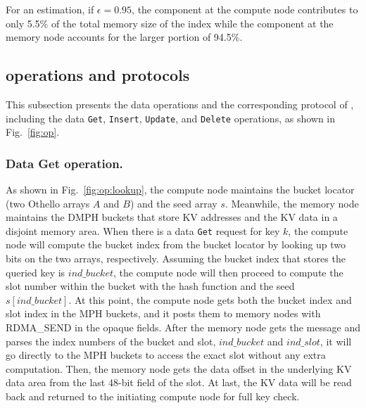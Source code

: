 For an estimation, if $\epsilon=0.95$, the component at the compute node contributes to only 5.5\% of the total memory size of the index while the component at the memory node accounts for the larger portion of 94.5\%.

\vspace{-1.5ex}
\subsection{\sys operations and protocols}
\label{subsec:design:operation}

This subsection presents the data operations and the corresponding protocol of \sys, including the data \texttt{Get}, \texttt{Insert}, \texttt{Update}, and \texttt{Delete} operations, as shown in Fig.~\ref{fig:op}.
\vspace{-1.ex}
\subsubsection{Data Get operation.}
As shown in Fig.~\ref{fig:op:lookup}, the compute node maintains the bucket locator (two Othello arrays $A$ and $B$) and the seed array $s$. Meanwhile, the memory node maintains the DMPH buckets that store KV addresses and the KV data in a disjoint memory area. 
When there is a data \texttt{Get} request for key $k$, the compute node will  compute the bucket index from the bucket locator by looking up two bits on the two arrays, respectively. 
Assuming the bucket index that stores the queried key is $ind\_bucket$, the compute node will then proceed to  compute the slot number within the bucket with the hash function and the seed $s[ind\_bucket]$. 
At this point, the compute node  gets both the bucket index and slot index in the MPH buckets, and it  posts them to memory nodes with RDMA\_SEND in the opaque fields. 
After the memory node gets the message and parses the index numbers of the bucket and slot, $ind\_bucket$ and $ind\_slot$, it will  go directly to the MPH buckets to access the exact slot without any extra computation. 
Then, the memory node  gets the data offset in the underlying KV data area from the last 48-bit field of the slot. At last,  the KV data will be read back and returned to the initiating compute node for full key check. 

